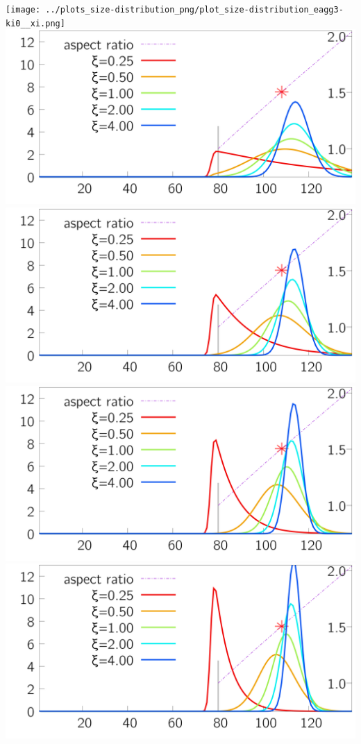 \begin{minipage}{0.25\textwidth} 
 \texttt{[image: ../plots\_size-distribution\_png/plot\_size-distribution\_eagg3-ki0\_\_xi.png]}
\includegraphics[width=\textwidth ]{../plots_size-distribution_png/plot_size-distribution_eagg3-ki1__xi.png}
\includegraphics[width=\textwidth ]{../plots_size-distribution_png/plot_size-distribution_eagg3-ki2__xi.png}
\includegraphics[width=\textwidth ]{../plots_size-distribution_png/plot_size-distribution_eagg3-ki3__xi.png}
\includegraphics[width=\textwidth ]{../plots_size-distribution_png/plot_size-distribution_eagg3-ki4__xi.png}
\end{minipage}%
